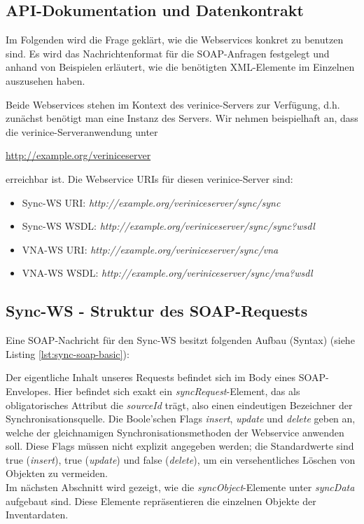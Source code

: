 \documentclass[a4paper,10pt]{book}
\begin{document}
\subsection{ API-Dokumentation und Datenkontrakt}
Im Folgenden wird die Frage geklärt, wie die Webservices konkret zu benutzen sind. Es wird das Nachrichtenformat für die SOAP-Anfragen festgelegt und anhand von Beispielen erläutert, wie die benötigten XML-Elemente im Einzelnen auszusehen haben.

Beide Webservices stehen im Kontext des verinice-Servers zur Verfügung, d.h.
zunächst benötigt man eine Instanz des Servers. Wir nehmen beispielhaft an, dass
die verinice-Serveranwendung unter

\href{http://example.org/veriniceserver}{http://example.org/veriniceserver}

erreichbar ist. Die Webservice URIs für diesen verinice-Server sind:
\begin{itemize}
 \item Sync-WS URI: \textit{http://example.org/veriniceserver/sync/sync}
 \item Sync-WS WSDL: \textit{http://example.org/veriniceserver/sync/sync?wsdl}
 \item VNA-WS URI: \textit{http://example.org/veriniceserver/sync/vna}
 \item VNA-WS WSDL: \textit{http://example.org/veriniceserver/sync/vna?wsdl}
\end{itemize}

\subsection{Sync-WS - Struktur des SOAP-Requests}
Eine SOAP-Nachricht für den Sync-WS besitzt folgenden Aufbau (Syntax) (siehe
Listing \ref{lst:sync-soap-basic}):
\pagebreak
\lstset{language=XML}


Der eigentliche Inhalt unseres Requests befindet sich im Body eines SOAP-Envelopes. Hier befindet sich exakt ein
\textit{syncRequest}-Element, das als obligatorisches Attribut die \textit{sourceId} trägt, also einen eindeutigen
Bezeichner der Synchronisationsquelle. Die Boole'schen Flags \textit{insert}, \textit{update} und \textit{delete} geben an,
welche der gleichnamigen Synchronisationsmethoden der Webservice anwenden soll. Diese Flags müssen nicht explizit angegeben werden;
die Standardwerte sind true (\textit{insert}), true (\textit{update}) und false (\textit{delete}), um ein versehentliches Löschen von Objekten zu vermeiden.
\newline\\
Im nächsten Abschnitt wird gezeigt, wie die \textit{syncObject}-Elemente unter \textit{syncData}
aufgebaut sind. Diese Elemente repräsentieren die einzelnen Objekte der Inventardaten.
\end{document}
